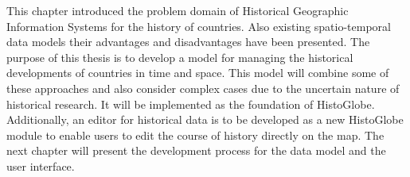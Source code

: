 This chapter introduced the problem domain of Historical Geographic Information Systems for the history of countries. Also existing spatio-temporal data models their advantages and disadvantages have been presented. The purpose of this thesis is to develop a model for managing the historical developments of countries in time and space. This model will combine some of these approaches and also consider complex cases due to the uncertain nature of historical research. It will be implemented as the foundation of HistoGlobe. Additionally, an editor for historical data is to be developed as a new HistoGlobe module to enable users to edit the course of history directly on the map. The next chapter will present the development process for the data model and the user interface.

